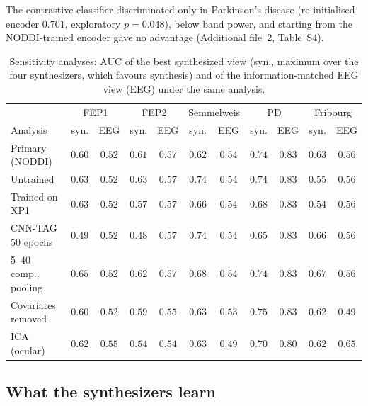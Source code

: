 \documentclass[pdflatex,referee,sn-basic]{sn-jnl}%
\begin{document}
The contrastive classifier discriminated only in Parkinson's disease (re-initialised encoder $0.701$, exploratory $p=0.048$), below band power, and starting from the NODDI-trained encoder gave no advantage (Additional file~2, Table~S4).

\begin{table}[!tbp]
    \centering
    \caption{Sensitivity analyses: AUC of the best synthesized view (syn., maximum over the four synthesizers, which favours synthesis) and of the information-matched EEG view (EEG) under the same analysis.}
    \label{tab:sens}
    \scriptsize\setlength{\tabcolsep}{2.5pt}
    \begin{tabular}{@{}l cc cc cc cc cc@{}}
        \hline
        & \multicolumn{2}{c}{FEP1} & \multicolumn{2}{c}{FEP2} & \multicolumn{2}{c}{Semmelweis} & \multicolumn{2}{c}{PD} & \multicolumn{2}{c}{Fribourg} \\
        Analysis & syn. & EEG & syn. & EEG & syn. & EEG & syn. & EEG & syn. & EEG \\
        \hline
        Primary (NODDI) & $0.60$ & $0.52$ & $0.61$ & $0.57$ & $0.62$ & $0.54$ & $0.74$ & $0.83$ & $0.63$ & $0.56$ \\
        Untrained & $0.63$ & $0.52$ & $0.63$ & $0.57$ & $0.74$ & $0.54$ & $0.74$ & $0.83$ & $0.55$ & $0.56$ \\
        Trained on XP1 & $0.63$ & $0.52$ & $0.57$ & $0.57$ & $0.66$ & $0.54$ & $0.68$ & $0.83$ & $0.54$ & $0.56$ \\
        CNN-TAG 50 epochs & $0.49$ & $0.52$ & $0.48$ & $0.57$ & $0.74$ & $0.54$ & $0.65$ & $0.83$ & $0.66$ & $0.56$ \\
        5--40 comp., pooling & $0.65$ & $0.52$ & $0.62$ & $0.57$ & $0.68$ & $0.54$ & $0.74$ & $0.83$ & $0.67$ & $0.56$ \\
        Covariates removed & $0.60$ & $0.52$ & $0.59$ & $0.55$ & $0.63$ & $0.53$ & $0.75$ & $0.83$ & $0.62$ & $0.49$ \\
        ICA (ocular) & $0.62$ & $0.55$ & $0.54$ & $0.54$ & $0.63$ & $0.49$ & $0.70$ & $0.80$ & $0.62$ & $0.65$ \\
        \hline
    \end{tabular}
\end{table}

\subsection{What the synthesizers learn}\label{section:res_fidelity}
\end{document}
